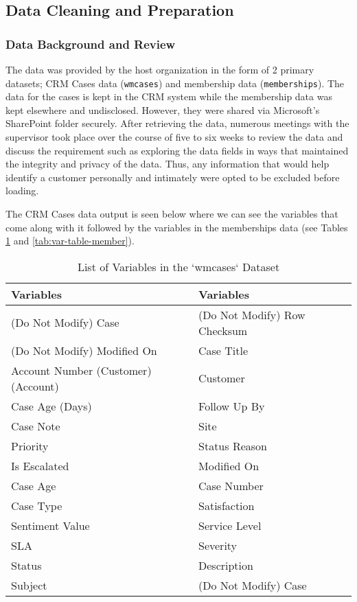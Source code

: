 \documentclass[
]{article}
\begin{document}
\subsection{Data Cleaning and Preparation}\label{data-cleaning-and-preparation}

\subsubsection{Data Background and Review}\label{data-background-and-review}

The data was provided by the host organization in the form of 2 primary datasets; CRM Cases data (\texttt{wmcases}) and membership data (\texttt{memberships}). The data for the cases is kept in the CRM system while the membership data was kept elsewhere and undisclosed. However, they were shared via Microsoft's SharePoint folder securely. After retrieving the data, numerous meetings with the supervisor took place over the course of five to six weeks to review the data and discuss the requirement such as exploring the data fields in ways that maintained the integrity and privacy of the data. Thus, any information that would help identify a customer personally and intimately were opted to be excluded before loading.

The CRM Cases data output is seen below where we can see the variables that come along with it followed by the variables in the memberships data (see Tables \ref{tab:var-table-cases} and \ref{tab:var-table-member}).

\begin{table}

\caption{\label{tab:var-table-cases}List of Variables in the `wmcases` Dataset}
\centering
\begin{tabular}[t]{l|l}
\hline
Variables & Variables\\
\hline
(Do Not Modify) Case & (Do Not Modify) Row Checksum\\
\hline
(Do Not Modify) Modified On & Case Title\\
\hline
Account Number (Customer) (Account) & Customer\\
\hline
Case Age (Days) & Follow Up By\\
\hline
Case Note & Site\\
\hline
Priority & Status Reason\\
\hline
Is Escalated & Modified On\\
\hline
Case Age & Case Number\\
\hline
Case Type & Satisfaction\\
\hline
Sentiment Value & Service Level\\
\hline
SLA & Severity\\
\hline
Status & Description\\
\hline
Subject & (Do Not Modify) Case\\
\hline
\end{tabular}
\end{table}
\end{document}
